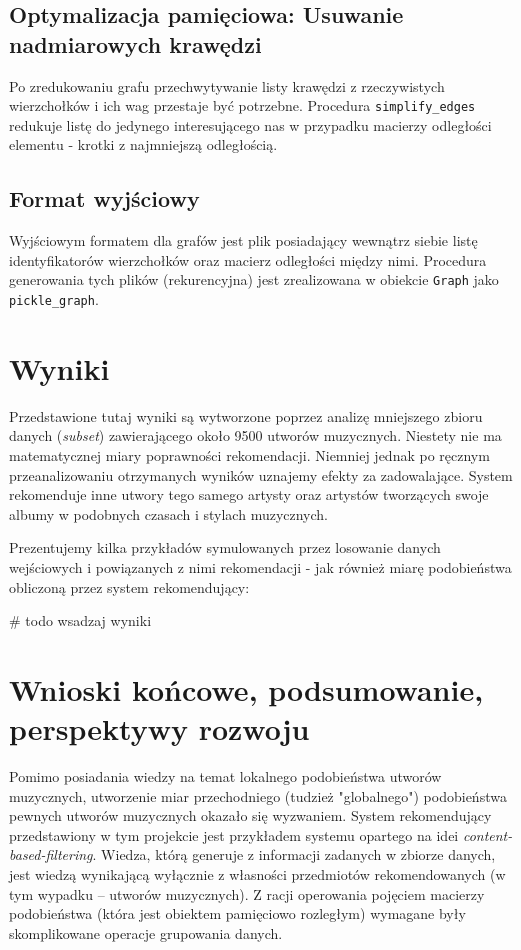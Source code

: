\documentclass[a4paper,10pt]{article}
\begin{document}
\subsection{Optymalizacja pamięciowa: Usuwanie nadmiarowych krawędzi}

Po zredukowaniu grafu przechwytywanie listy krawędzi z rzeczywistych wierzchołków i ich wag przestaje być potrzebne. Procedura \texttt{simplify\_edges} redukuje listę do jedynego interesującego nas w przypadku macierzy odległości elementu - krotki z najmniejszą odległością.

\subsection{Format wyjściowy}

Wyjściowym formatem dla grafów jest plik posiadający wewnątrz siebie listę identyfikatorów wierzchołków oraz macierz odległości między nimi. Procedura generowania tych plików (rekurencyjna) jest zrealizowana w obiekcie \texttt{Graph} jako \texttt{pickle\_graph}.

\section{Wyniki}

Przedstawione tutaj wyniki są wytworzone poprzez analizę mniejszego zbioru danych (\textit{subset}) zawierającego około 9500 utworów muzycznych.
Niestety nie ma matematycznej miary poprawności rekomendacji. Niemniej jednak po ręcznym przeanalizowaniu otrzymanych wyników uznajemy efekty za zadowalające. System rekomenduje inne utwory tego samego artysty oraz artystów tworzących swoje albumy w podobnych czasach i stylach muzycznych.

Prezentujemy kilka przykładów symulowanych przez losowanie danych wejściowych i powiązanych z nimi rekomendacji - jak również miarę podobieństwa obliczoną przez system rekomendujący:

# todo wsadzaj wyniki

\section{Wnioski końcowe, podsumowanie, perspektywy rozwoju}

Pomimo posiadania wiedzy na temat lokalnego podobieństwa utworów muzycznych, utworzenie miar przechodniego (tudzież "globalnego") podobieństwa pewnych utworów muzycznych okazało się wyzwaniem. System rekomendujący przedstawiony w tym projekcie jest przykładem systemu opartego na idei \textit{content-based-filtering}. Wiedza, którą generuje z informacji zadanych w zbiorze danych, jest wiedzą wynikającą wyłącznie z własności przedmiotów rekomendowanych (w tym wypadku -- utworów muzycznych). Z racji operowania pojęciem macierzy podobieństwa (która jest obiektem pamięciowo rozległym) wymagane były skomplikowane operacje grupowania danych.
\end{document}
